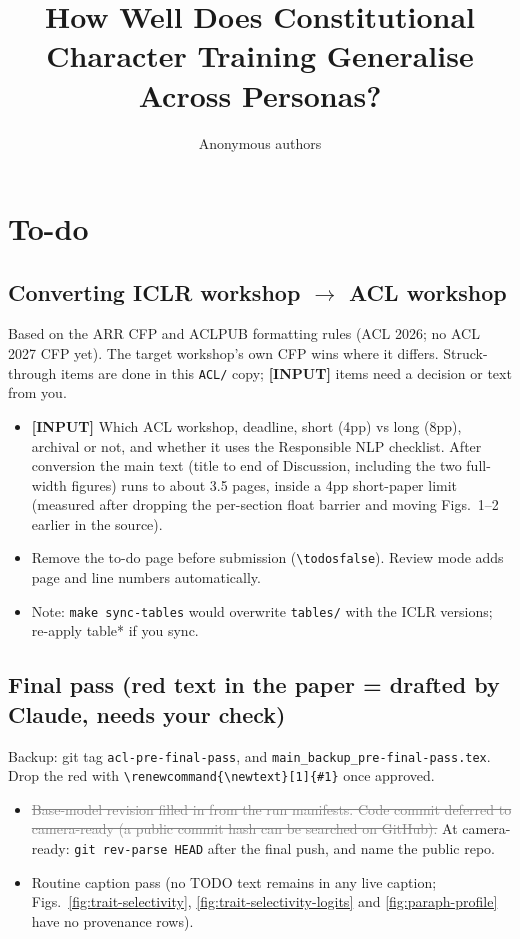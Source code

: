 \documentclass[11pt]{article}
\title{How Well Does Constitutional Character Training Generalise Across Personas?}
\author{Anonymous authors}
\newcommand{\done}[1]{\textcolor{gray}{\sout{#1}}}
\begin{document}
\newif\iftodos
\todosfalse
\iftodos
\thispagestyle{empty}
\section*{To-do}

\subsection*{Converting ICLR workshop $\rightarrow$ ACL workshop}
Based on the ARR CFP and ACLPUB formatting rules (ACL 2026; no ACL 2027 CFP yet). The target workshop's own CFP wins where it differs. Struck-through items are done in this \texttt{ACL/} copy; \textbf{[INPUT]} items need a decision or text from you.
\begin{itemize}
  \item \textbf{[INPUT]} Which ACL workshop, deadline, short (4pp) vs long (8pp), archival or not, and whether it uses the Responsible NLP checklist. After conversion the main text (title to end of Discussion, including the two full-width figures) runs to about 3.5 pages, inside a 4pp short-paper limit (measured after dropping the per-section float barrier and moving Figs.~1--2 earlier in the source).
  \item Remove the to-do page before submission (\texttt{\textbackslash todosfalse}). Review mode adds page and line numbers automatically.
  \item Note: \texttt{make sync-tables} would overwrite \texttt{tables/} with the ICLR versions; re-apply table* if you sync.
\end{itemize}

\subsection*{Final pass (red text in the paper = drafted by Claude, needs your check)}
Backup: git tag \texttt{acl-pre-final-pass}, and \texttt{main\_backup\_pre-final-pass.tex}. Drop the red with \texttt{\textbackslash renewcommand\{\textbackslash newtext\}[1]\{\#1\}} once approved.
\begin{itemize}
  \item \done{Base-model revision filled in from the run manifests. Code commit deferred to camera-ready (a public commit hash can be searched on GitHub).} At camera-ready: \texttt{git rev-parse HEAD} after the final push, and name the public repo.
  \item Routine caption pass (no TODO text remains in any live caption; Figs.~\ref{fig:trait-selectivity}, \ref{fig:trait-selectivity-logits} and \ref{fig:paraph-profile} have no provenance rows).
\end{itemize}
\end{document}
